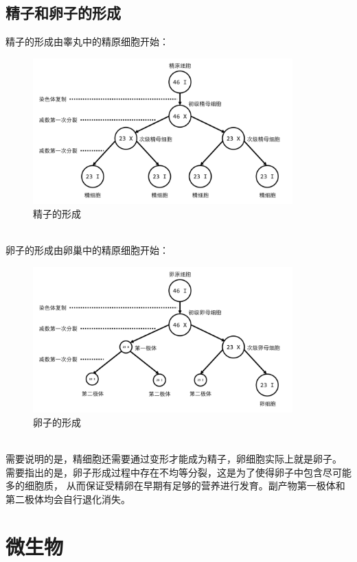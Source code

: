 \documentclass[UTF8]{ctexart}
\begin{document}
\subsection{精子和卵子的形成}
    精子的形成由睾丸中的精原细胞开始：
    \begin{figure}[h]
        \begin{center}
            \includegraphics[width=10cm]{BiologyImage/48.jpg}
            \caption{精子的形成}
        \end{center}
    \end{figure}\\
    卵子的形成由卵巢中的精原细胞开始：
    \begin{figure}[h]
        \begin{center}
            \includegraphics[width=10cm]{BiologyImage/49.jpg}
            \caption{卵子的形成}
        \end{center}
    \end{figure} \\
    需要说明的是，精细胞还需要通过变形才能成为精子，卵细胞实际上就是卵子。\\[3mm]
    需要指出的是，卵子形成过程中存在不均等分裂，这是为了使得卵子中包含尽可能多的细胞质，
    从而保证受精卵在早期有足够的营养进行发育。副产物第一极体和第二极体均会自行退化消失。

\newpage

\section{微生物}
\end{document}
